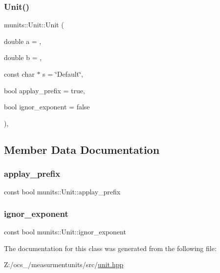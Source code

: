 \subsubsection{\texorpdfstring{Unit()}{Unit()}}
{\footnotesize\ttfamily munits\+::\+Unit\+::\+Unit (\begin{DoxyParamCaption}\item[{double}]{a = {},  }\item[{double}]{b = {},  }\item[{const char $\ast$}]{s = {\ttfamily \char`\"{}Default\char`\"{}},  }\item[{bool}]{applay\+\_\+prefix = {\ttfamily true},  }\item[{bool}]{ignor\+\_\+exponent = {\ttfamily false} }\end{DoxyParamCaption})\hspace{0.3cm}{\ttfamily [inline]}, {\ttfamily [explicit]}}



\subsection{Member Data Documentation}
\mbox{\label{classmunits_1_1_unit_a83a409eaa2d8bcb5940d90488f41bfbf}} 
\subsubsection{\texorpdfstring{applay\+\_\+prefix}{applay\_prefix}}
{\footnotesize\ttfamily const bool munits\+::\+Unit\+::applay\+\_\+prefix}

\mbox{\label{classmunits_1_1_unit_a52145682ed514d15c6a79e0f6d9c2c90}} 
\subsubsection{\texorpdfstring{ignor\+\_\+exponent}{ignor\_exponent}}
{\footnotesize\ttfamily const bool munits\+::\+Unit\+::ignor\+\_\+exponent}



The documentation for this class was generated from the following file\+:\begin{DoxyCompactItemize}
\item 
Z\+:/ocs\+\_/measurmentunits/src/\hyperlink{unit_8hpp}{unit.\+hpp}\end{DoxyCompactItemize}
